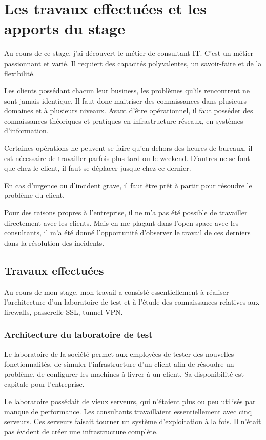 \chapter{Les travaux effectuées et les apports du stage}
Au cours de ce stage, j'ai découvert le métier de consultant IT.
C'est un métier passionnant et varié.
Il requiert des capacités polyvalentes, un savoir-faire et de la flexibilité.

Les clients possédant chacun leur business, les problèmes qu'ils rencontrent ne sont jamais identique.
Il faut donc maitriser des connaissances dans plusieurs domaines et à plusieurs niveaux.
Avant d'être opérationnel, il faut posséder des connaissances théoriques et pratiques en infrastructure réseaux, en systèmes d'information.

Certaines opérations ne peuvent se faire qu'en dehors des heures de bureaux, il est nécessaire de travailler parfois plus tard ou le weekend. 
D'autres ne se font que chez le client, il faut se déplacer jusque chez ce dernier.

En cas d'urgence ou d'incident grave, il faut être prêt à partir pour résoudre le problème du client. 

Pour des raisons propres à l'entreprise, il ne m'a pas été possible de travailler directement avec les clients.
Mais en me plaçant dans l'open space avec les consultants, il m'a été donné l'opportunité d'observer le travail de ces derniers dans la résolution des incidents.

\section{Travaux effectuées}
Au cours de mon stage, mon travail a consisté essentiellement à réaliser l'architecture d'un laboratoire de test et à l'étude des connaissances relatives aux firewalls, passerelle SSL, tunnel VPN.

\subsection{Architecture du laboratoire de test}
Le laboratoire de la société permet aux employées de tester des nouvelles fonctionnalités, de simuler l'infrastructure d'un client afin de résoudre un problème, de configurer les machines à livrer à un client.
Sa disponibilité est capitale pour l'entreprise.

Le laboratoire possédait de vieux serveurs, qui n'étaient plus ou peu utilisés par manque de performance.
Les consultants travaillaient essentiellement avec cinq serveurs.
Ces serveurs faisait tourner un système d'exploitation à la fois.
Il n'était pas évident de créer une infrastructure complète.

